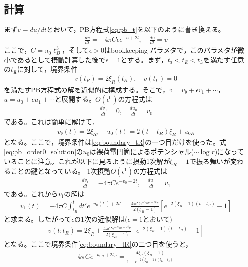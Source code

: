 \documentclass[11pt,a4paper]{ltjsarticle}
\theoremstyle{definition}
\theoremstyle{remark}
\begin{document}
\subsection{計算}
まず$v=du/dt$とおいて，PB方程式\eqref{eq:pb_t}を以下のように書き換える。
\begin{align}
  \frac{dv}{dt} = -4\pi C \epsilon e^{-u+2t}, \quad \frac{du}{dt} = v \label{eq:pb_first_order}
\end{align}
ここで，$C=n_0\ell_B^3$，そして$\epsilon >0$はbookkeeping パラメタで，このパラメタが微小であるとして摂動計算した後で$\epsilon=1$とする。まず，$t_a<t_R<t_L$を満たす任意の$t_R$に対して，境界条件
\begin{align}
  v(t_R) = 2\xi_R(t_R), \quad v(t_L) = 0 \label{eq:boundary_tR}
\end{align}
を満たすPB方程式の解を近似的に構成する。そこで，$v=v_0+\epsilon v_1 + \cdots$，$u=u_0+\epsilon u_1 + \cdots$と展開する。$O(\epsilon^0)$の方程式は
\begin{align}
  \frac{dv_0}{dt} = 0, \quad \frac{du_0}{dt} = v_0 \label{eq:pb_order0}
\end{align}
である。これは簡単に解けて，
\begin{align}
  v_0(t) = 2\xi_R, \quad u_0(t) = 2(t-t_R)\xi_R  + u_{0R} \label{eq:pb_order0_solution}
\end{align}
となる。ここで，境界条件は\eqref{eq:boundary_tR}の一つ目だけを使った。式\eqref{eq:pb_order0_solution}の$u_0$は裸荷電円筒によるポテンシャル($\sim \log r$)になっていることに注意。これが以下に見るように摂動1次解が$\xi_R=1$で振る舞いが変わることの鍵となっている。 1次摂動$O(\epsilon^1)$の方程式は
\begin{align}
  \frac{dv_1}{dt} = -4\pi C e^{-u_0+2t}, \quad \frac{du_1}{dt} = v_1 \label{eq:pb_order1}
\end{align}
である。これから$v_1$の解は
\begin{align}
  v_1(t) = -4\pi C \int_{t_R}^t dt' e^{-u_0(t')+2t'}=\frac{4\pi Ce^{-u_{0R}+2t_R}}{2(\xi_R-1)} \left[ e^{-2(\xi_R-1)(t-t_R)}-1\right] \label{eq:v1_solution}
\end{align}
と求まる。したがって$\epsilon$の1次の近似解は($\epsilon=1$とおいて)
\begin{align}
  v(t;t_R) = 2\xi_R + \frac{4\pi Ce^{-u_{0R}+2t_R}}{2(\xi_R-1)} \left[ e^{-2(\xi_R-1)(t-t_R)}-1\right] \label{eq:v_approx}
\end{align}
となる。ここで境界条件\eqref{eq:boundary_tR}の二つ目を使うと，
\begin{align}
  4\pi C e^{-u_{0R}+2t_R} = \frac{4\xi_R(\xi_R-1)}{1-e^{-2(\xi_R-1)(t_L-t_R)}} \label{eq:u0R_solution}
\end{align}
\end{document}
